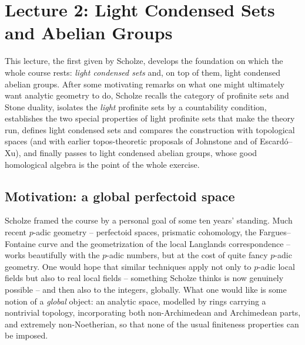 \section{Lecture 2: Light Condensed Sets and Abelian Groups}
\label{lec:2}

This lecture, the first given by Scholze, develops the foundation on which the
whole course rests: \emph{light condensed sets} and, on top of them, light
condensed abelian groups. After some motivating remarks on what one might
ultimately want analytic geometry to do, Scholze recalls the category of
profinite sets and Stone duality, isolates the \emph{light} profinite sets by a
countability condition, establishes the two special properties of light
profinite sets that make the theory run, defines light condensed sets and
compares the construction with topological spaces (and with earlier
topos-theoretic proposals of Johnstone and of Escard\'o--Xu), and finally passes
to light condensed abelian groups, whose good homological algebra is the point
of the whole exercise.

\subsection{Motivation: a global perfectoid space}

Scholze framed the course by a personal goal of some ten years' standing. Much
recent $p$-adic geometry -- perfectoid spaces, prismatic cohomology, the
Fargues--Fontaine curve and the geometrization of the local Langlands
correspondence \cite{fargues2024geometrizationlocallanglandscorrespondence} --
works beautifully with the $p$-adic numbers, but at the cost of quite fancy
$p$-adic geometry. One would hope that similar techniques apply not only to
$p$-adic local fields but also to real local fields -- something Scholze thinks
is now genuinely possible -- and then also to the integers, globally. What one
would like is some notion of a \emph{global} object: an analytic space, modelled
by rings carrying a nontrivial topology, incorporating both non-Archimedean and
Archimedean parts, and extremely non-Noetherian, so that none of the usual
finiteness properties can be imposed.

